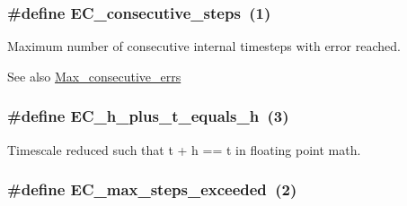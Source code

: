 \subsubsection[{\texorpdfstring{E\+C\+\_\+consecutive\+\_\+steps}{EC_consecutive_steps}}]{\setlength{\rightskip}{0pt plus 5cm}\#define E\+C\+\_\+consecutive\+\_\+steps~(1)}\hypertarget{group__RKCU__ErrCodes_gae0287841c08f86f5709660fd731615ad}{}\label{group__RKCU__ErrCodes_gae0287841c08f86f5709660fd731615ad}


Maximum number of consecutive internal timesteps with error reached. 

\begin{DoxySeeAlso}{See also}
\hyperlink{radau2a_8cu_a172b5bc0830959ab49ca7cb9f0ae44bf}{Max\+\_\+consecutive\+\_\+errs} 
\end{DoxySeeAlso}
\subsubsection[{\texorpdfstring{E\+C\+\_\+h\+\_\+plus\+\_\+t\+\_\+equals\+\_\+h}{EC_h_plus_t_equals_h}}]{\setlength{\rightskip}{0pt plus 5cm}\#define E\+C\+\_\+h\+\_\+plus\+\_\+t\+\_\+equals\+\_\+h~(3)}\hypertarget{group__RKCU__ErrCodes_ga9326efd544880e2683c4453365ca2704}{}\label{group__RKCU__ErrCodes_ga9326efd544880e2683c4453365ca2704}


Timescale reduced such that t + h == t in floating point math. 

\subsubsection[{\texorpdfstring{E\+C\+\_\+max\+\_\+steps\+\_\+exceeded}{EC_max_steps_exceeded}}]{\setlength{\rightskip}{0pt plus 5cm}\#define E\+C\+\_\+max\+\_\+steps\+\_\+exceeded~(2)}\hypertarget{group__RKCU__ErrCodes_ga0f0275d9851ab5c19b79a963d5084df3}{}\label{group__RKCU__ErrCodes_ga0f0275d9851ab5c19b79a963d5084df3}


